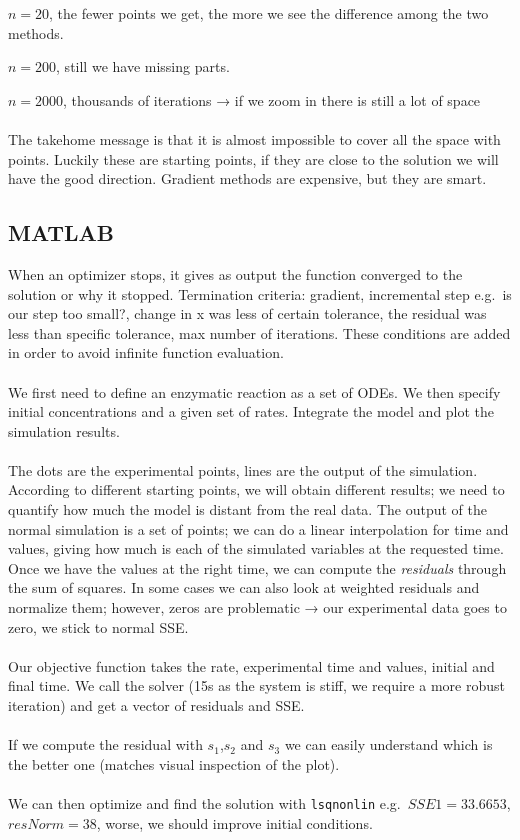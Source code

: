 $n = 20$, the fewer points we get, the more we see the difference among
the two methods.

$n = 200$, still we have missing parts.

$n = 2000$, thousands of iterations → if we zoom in there is still a lot
of space
\\
\\
\noindent
The takehome message is that it is almost impossible to cover all the
space with points. Luckily these are starting points, if they are close
to the solution we will have the good direction. Gradient methods are
expensive, but they are smart.


\subsection{MATLAB}

When an optimizer stops, it gives as output the function converged to
the solution or why it stopped. Termination criteria: gradient,
incremental step e.g.~is our step too small?, change in x was less of
certain tolerance, the residual was less than specific tolerance, max
number of iterations. These conditions are added in order to avoid
infinite function evaluation.
\\
\\
\noindent
We first need to define an enzymatic reaction as a set of ODEs. We then
specify initial concentrations and a given set of rates. Integrate the
model and plot the simulation results.
\\
\\
\noindent
The dots are the experimental points, lines are the output of the
simulation. According to different starting points, we will obtain
different results; we need to quantify how much the model is distant
from the real data. The output of the normal simulation is a set of
points; we can do a linear interpolation for time and values, giving how
much is each of the simulated variables at the requested time. Once we
have the values at the right time, we can compute the \emph{residuals}
through the sum of squares. In some cases we can also look at weighted
residuals and normalize them; however, zeros are problematic → our
experimental data goes to zero, we stick to normal SSE.
\\
\\
\noindent
Our objective function takes the rate, experimental time and values,
initial and final time. We call the solver (15s as the system is stiff,
we require a more robust iteration) and get a vector of residuals and
SSE.
\\
\\
\noindent
If we compute the residual with $s_1$,$s_2$ and $s_3$ we can easily understand
which is the better one (matches visual inspection of the plot).
\\
\\
\noindent
We can then optimize and find the solution with \texttt{lsqnonlin}
e.g.~$SSE1 = 33.6653$, $resNorm = 38$, worse, we should improve initial
conditions.

